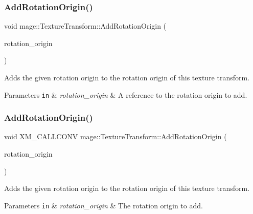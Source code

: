 \subsubsection{\texorpdfstring{Add\+Rotation\+Origin()}{AddRotationOrigin()}\hspace{0.1cm}{\footnotesize\ttfamily [2/3]}}
{\footnotesize\ttfamily void mage\+::\+Texture\+Transform\+::\+Add\+Rotation\+Origin (\begin{DoxyParamCaption}\item[{const \hyperlink{namespacemage_aa87237ad091f5cd7da612b8523fc108f}{F32x2} \&}]{rotation\+\_\+origin }\end{DoxyParamCaption})\hspace{0.3cm}{\ttfamily [noexcept]}}

Adds the given rotation origin to the rotation origin of this texture transform.


\begin{DoxyParams}[1]{Parameters}
\mbox{\tt in}  & {\em rotation\+\_\+origin} & A reference to the rotation origin to add. \\
\hline
\end{DoxyParams}
\hypertarget{classmage_1_1_texture_transform_a67e287acb98ea8aeeda4e3466859c8b6}{}\label{classmage_1_1_texture_transform_a67e287acb98ea8aeeda4e3466859c8b6} 
\subsubsection{\texorpdfstring{Add\+Rotation\+Origin()}{AddRotationOrigin()}\hspace{0.1cm}{\footnotesize\ttfamily [3/3]}}
{\footnotesize\ttfamily void X\+M\+\_\+\+C\+A\+L\+L\+C\+O\+NV mage\+::\+Texture\+Transform\+::\+Add\+Rotation\+Origin (\begin{DoxyParamCaption}\item[{F\+X\+M\+V\+E\+C\+T\+OR}]{rotation\+\_\+origin }\end{DoxyParamCaption})\hspace{0.3cm}{\ttfamily [noexcept]}}

Adds the given rotation origin to the rotation origin of this texture transform.


\begin{DoxyParams}[1]{Parameters}
\mbox{\tt in}  & {\em rotation\+\_\+origin} & The rotation origin to add. \\
\hline
\end{DoxyParams}
\hypertarget{classmage_1_1_texture_transform_a591aacd1662da3de581d440d921a99df}{}\label{classmage_1_1_texture_transform_a591aacd1662da3de581d440d921a99df} 
